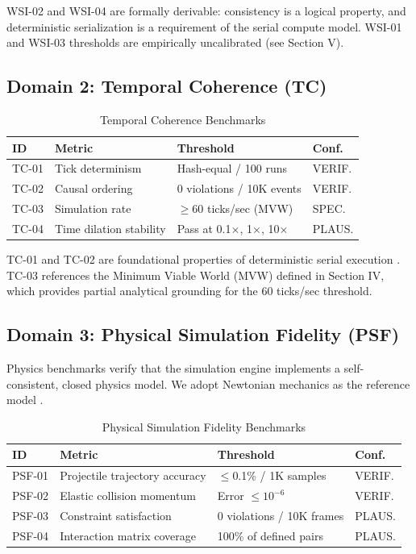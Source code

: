 \documentclass[conference]{IEEEtran}
\begin{document}
WSI-02 and WSI-04 are formally derivable: consistency is a logical property, and
deterministic serialization is a requirement of the serial compute model. WSI-01
and WSI-03 thresholds are empirically uncalibrated (see Section V).

\subsection{Domain 2: Temporal Coherence (TC)}

\begin{table}[ht]
\caption{Temporal Coherence Benchmarks}
\label{tab:tc}
\centering
\small
\begin{tabular}{p{0.7cm}p{3.2cm}p{1.8cm}p{1.0cm}}
\toprule
\textbf{ID} & \textbf{Metric} & \textbf{Threshold} & \textbf{Conf.} \\
\midrule
TC-01 & Tick determinism & Hash-equal / 100 runs & VERIF. \\
TC-02 & Causal ordering & 0 violations / 10K events & VERIF. \\
TC-03 & Simulation rate & $\geq$60 ticks/sec (MVW) & SPEC. \\
TC-04 & Time dilation stability & Pass at 0.1$\times$, 1$\times$, 10$\times$ & PLAUS. \\
\bottomrule
\end{tabular}
\end{table}

TC-01 and TC-02 are foundational properties of deterministic serial execution
\cite{lamport1978}. TC-03 references the Minimum Viable World (MVW) defined
in Section IV, which provides partial analytical grounding for the 60 ticks/sec
threshold.

\subsection{Domain 3: Physical Simulation Fidelity (PSF)}

Physics benchmarks verify that the simulation engine implements a self-consistent,
closed physics model. We adopt Newtonian mechanics as the reference model
\cite{goldstein2002}.

\begin{table}[ht]
\caption{Physical Simulation Fidelity Benchmarks}
\label{tab:psf}
\centering
\small
\begin{tabular}{p{0.7cm}p{3.2cm}p{1.8cm}p{1.0cm}}
\toprule
\textbf{ID} & \textbf{Metric} & \textbf{Threshold} & \textbf{Conf.} \\
\midrule
PSF-01 & Projectile trajectory accuracy & $\leq$0.1\% / 1K samples & VERIF. \\
PSF-02 & Elastic collision momentum & Error $\leq 10^{-6}$ & VERIF. \\
PSF-03 & Constraint satisfaction & 0 violations / 10K frames & PLAUS. \\
PSF-04 & Interaction matrix coverage & 100\% of defined pairs & PLAUS. \\
\bottomrule
\end{tabular}
\end{table}
\end{document}
